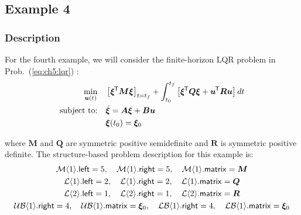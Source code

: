 \subsection{Example 4} \label{sec:ch5:example4}

\subsubsection{Description}

For the fourth example, we will consider the finite-horizon LQR problem in Prob.~(\ref{eq:ch5:lqr}) \cite{Bryson1975a,Liberzon2012a}:%
\begin{subequations}%
\begin{align}
\min_{\bm{u}(t)} \quad & \left[ \bm{\xi}^{\mkern-1.5mu\mathsf{T}} \bm{M} \bm{\xi} \right]_{t=t_f} + 
\int_{t_0}^{t_f} \left[ \bm{\xi}^{\mkern-1.5mu\mathsf{T}} \bm{Q} \bm{\xi} + \bm{u}^{\mkern-1.5mu\mathsf{T}} \bm{R} \bm{u} \right] dt \\
\text{subject to:} \quad & \dot{\bm{\xi}} = \bm{A} \bm{\xi} + \bm{B} \bm{u} \\
& \bm{\xi}(t_0) = \bm{\xi}_0
\end{align}
\end{subequations}%

\noindent where $\bm{M}$ and $\bm{Q}$ are symmetric positive semidefinite and $\bm{R}$ is symmetric positive definite.
The structure-based problem description for this example is:%
\allowdisplaybreaks[1]%
\begin{subequations}%
\begin{gather}
\mathcal{M}\langle{1}\rangle.\textup{\textsf{left}} = 5, \quad \mathcal{M}\langle{1}\rangle.\textup{\textsf{right}} = 5, \quad \mathcal{M}\langle{1}\rangle.\textup{\textsf{matrix}} = \bm{M} \\
\mathcal{L}\langle{1}\rangle.\textup{\textsf{left}} = 2, \quad \mathcal{L}\langle{1}\rangle.\textup{\textsf{right}} = 2, \quad \mathcal{L}\langle{1}\rangle.\textup{\textsf{matrix}} = \bm{Q} \\
\mathcal{L}\langle{2}\rangle.\textup{\textsf{left}} = 1, \quad \mathcal{L}\langle{2}\rangle.\textup{\textsf{right}} = 1, \quad \mathcal{L}\langle{2}\rangle.\textup{\textsf{matrix}} = \bm{R} \\
\mathcal{UB}\langle{1}\rangle.\textup{\textsf{right}} = 4, \quad \mathcal{UB}\langle{1}\rangle.\textup{\textsf{matrix}} = \bm{\xi}_0, \quad
\mathcal{LB}\langle{1}\rangle.\textup{\textsf{right}} = 4, \quad \mathcal{LB}\langle{1}\rangle.\textup{\textsf{matrix}} = \bm{\xi}_0
\end{gather}
\end{subequations}%
\allowdisplaybreaks[0]%

